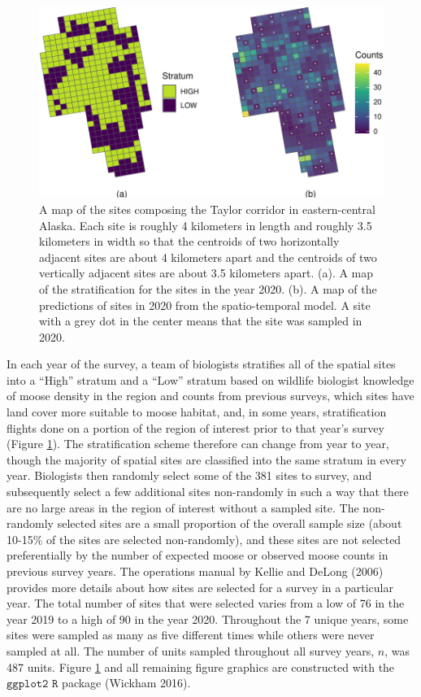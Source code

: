 \documentclass[]{article}    %
\begin{document}
\begin{figure}
\centering
\includegraphics{area_map.pdf}
\caption{\label{fig:sitepredmap} A map of the sites composing the Taylor
corridor in eastern-central Alaska. Each site is roughly 4 kilometers in
length and roughly 3.5 kilometers in width so that the centroids of two
horizontally adjacent sites are about 4 kilometers apart and the
centroids of two vertically adjacent sites are about 3.5 kilometers
apart. (a). A map of the stratification for the sites in the year 2020.
(b). A map of the predictions of sites in 2020 from the spatio-temporal
model. A site with a grey dot in the center means that the site was
sampled in 2020.}
\end{figure}

In each year of the survey, a team of biologists stratifies all of the
spatial sites into a ``High'' stratum and a ``Low'' stratum based on
wildlife biologist knowledge of moose density in the region and counts
from previous surveys, which sites have land cover more suitable to
moose habitat, and, in some years, stratification flights done on a
portion of the region of interest prior to that year's survey (Figure
\ref{fig:sitepredmap}). The stratification scheme therefore can change
from year to year, though the majority of spatial sites are classified
into the same stratum in every year. Biologists then randomly select
some of the 381 sites to survey, and subsequently select a few
additional sites non-randomly in such a way that there are no large
areas in the region of interest without a sampled site. The non-randomly
selected sites are a small proportion of the overall sample size (about
10-15\% of the sites are selected non-randomly), and these sites are not
selected preferentially by the number of expected moose or observed
moose counts in previous survey years. The operations manual by Kellie
and DeLong (2006) provides more details about how sites are selected for
a survey in a particular year. The total number of sites that were
selected varies from a low of 76 in the year 2019 to a high of 90 in the
year 2020. Throughout the 7 unique years, some sites were sampled as
many as five different times while others were never sampled at all. The
number of units sampled throughout all survey years, \(n\), was 487
units. Figure \ref{fig:sitepredmap} and all remaining figure graphics
are constructed with the \(\texttt{ggplot2 R}\) package (Wickham 2016).
\end{document}
